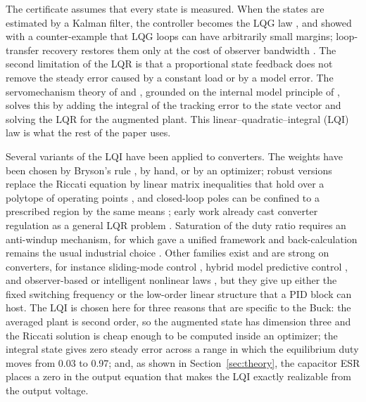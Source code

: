The certificate assumes that every state is measured. When the states are
estimated by a Kalman filter, the controller becomes the LQG law
\citep{Athans1971}, and \citet{Doyle1978} showed with a counter-example that
LQG loops can have arbitrarily small margins; loop-transfer recovery restores
them only at the cost of observer bandwidth \citep{Doyle1979}. The second
limitation of the LQR is that a proportional state feedback does not remove the
steady error caused by a constant load or by a model error. The servomechanism
theory of \citet{Young1972} and \citet{Davison1976}, grounded on the internal
model principle of \citet{Francis1976}, solves this by adding the integral of
the tracking error to the state vector and solving the LQR for the augmented
plant. This linear--quadratic--integral (LQI) law is what the rest of the paper
uses.

Several variants of the LQI have been applied to converters. The weights have
been chosen by Bryson's rule \citep{Bryson1975}, by hand, or by an optimizer;
robust versions replace the Riccati equation by linear matrix inequalities that
hold over a polytope of operating points \citep{Olalla2009}, and closed-loop
poles can be confined to a prescribed region by the same means
\citep{Chilali1996};
early work already cast converter regulation as a general LQR problem
\citep{Leung1991}. Saturation of the duty ratio requires an anti-windup
mechanism, for which \citet{Kothare1994} gave a unified framework and
back-calculation remains the usual industrial choice \citep{Astrom1989}.
Other families exist and are strong on converters, for instance sliding-mode
control \citep{Tan2008}, hybrid model predictive control
\citep{Geyer2008,Liu2018}, and observer-based or intelligent nonlinear laws
\citep{Abdelmalek2020,Sitbon2020,Bouchama2020}, but they give up either the fixed switching
frequency or the low-order linear structure that a PID block can host. The LQI
is chosen here for three reasons that are specific to the Buck: the averaged
plant is second order, so the augmented state has dimension three and the
Riccati solution is cheap enough to be computed inside an optimizer; the
integral state gives zero steady error across a range in which the equilibrium
duty moves from 0.03 to 0.97; and, as shown in Section~\ref{sec:theory}, the
capacitor ESR places a zero in the output equation that makes the LQI exactly
realizable from the output voltage.


